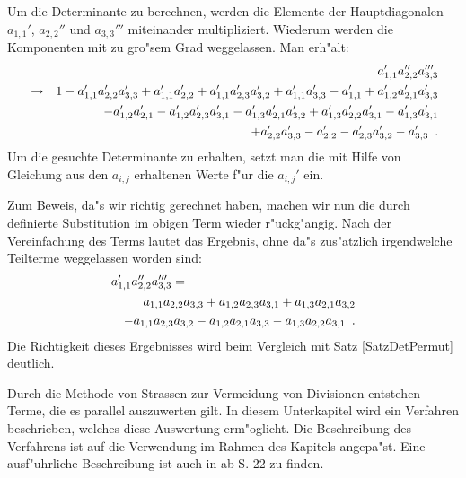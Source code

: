 Um die Determinante zu berechnen, werden die Elemente der Hauptdiagonalen
$a_{1,1}'$, $a_{2,2}''$ und $a_{3,3}'''$ miteinander multipliziert.
Wiederum werden die Komponenten mit zu gro"sem Grad weggelassen. Man
erh"alt:
\begin{eqnarray*}
   & & a_{1,1}' a_{2,2}'' a_{3,3}''' \\
   & \rightarrow &
   1-a_{1,1}'a_{2,2}'a_{3,3}'+ a_{1,1}'a_{2,2}' + a_{1,1}'a_{2,3}'a_{3,2}'
   + a_{1,1}'a_{3,3}' - a_{1,1}' + a_{1,2}'a_{2,1}'a_{3,3}' \\
   & &
   - a_{1,2}'a_{2,1}' - a_{1,2}'a_{2,3}'a_{3,1}' - a_{1,3}'a_{2,1}'a_{3,2}'
   + a_{1,3}'a_{2,2}'a_{3,1}' - a_{1,3}'a_{3,1}' \\
   & &
   + a_{2,2}'a_{3,3}' - a_{2,2}'  - a_{2,3}'a_{3,2}' - a_{3,3}' \mbox{\hspace{0.5em}.}
\end{eqnarray*}
Um die gesuchte Determinante zu erhalten, setzt man die mit Hilfe von
Gleichung  aus den $a_{i,j}$ erhaltenen
Werte f"ur die $a_{i,j}'$ ein.

Zum Beweis, da"s wir richtig gerechnet haben, machen wir nun die
durch  definierte Substitution im obigen Term
wieder r"uckg"angig. Nach der Vereinfachung des Terms lautet das Ergebnis,
ohne da"s zus"atzlich irgendwelche Teilterme weggelassen worden sind:
\begin{eqnarray*}
  \lefteqn{ a_{1,1}' a_{2,2}'' a_{3,3}''' = } \\
 & & a_{1,1}a_{2,2}a_{3,3} + a_{1,2}a_{2,3}a_{3,1} + a_{1,3}a_{2,1}a_{3,2} \\
 & & - a_{1,1}a_{2,3}a_{3,2} - a_{1,2}a_{2,1}a_{3,3} - a_{1,3}a_{2,2}a_{3,1}
    \MyPunkt
\end{eqnarray*}
Die Richtigkeit dieses Ergebnisses wird beim Vergleich mit Satz
\ref{SatzDetPermut} deutlich.


\label{SecVSBR}

Durch die Methode von Strassen zur Vermeidung von Divisionen entstehen
Terme, die es parallel auszuwerten gilt. In diesem Unterkapitel wird
ein Verfahren \cite{VSBR83} beschrieben, welches diese Auswertung
erm"oglicht. Die
Beschreibung des Verfahrens ist auf die Verwendung im Rahmen des
Kapitels angepa"st. Eine ausf"uhrliche Beschreibung ist auch in
\cite{Wald87} ab S. 22 zu finden.

